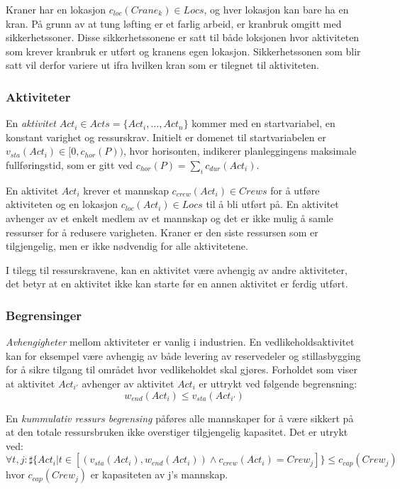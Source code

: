 Kraner har en lokasjon $ c_{loc}(Crane_{k}) \in Locs $, og hver lokasjon kan bare ha en kran. På grunn av at tung løfting er et farlig arbeid, er kranbruk omgitt med sikkerhetssoner. Disse sikkerhetssonene er satt til både loksjonen hvor aktiviteten som krever kranbruk er utført og kranens egen lokasjon. Sikkerhetssonen som blir satt vil derfor variere ut ifra hvilken kran som er tilegnet til aktiviteten.

\subsubsection{Aktiviteter}
En \textit{aktivitet} $ Act_{i} \in Acts = \{ Act_{i},\dots,Act_{n} \} $ kommer med en startvariabel, en konstant varighet og ressurskrav. Initielt er domenet til startvariabelen er $ v_{sta}(Act_{i}) \in [ 0, c_{hor}(P)) $, hvor horisonten, indikerer planleggingens maksimale fullføringstid, som er gitt ved $ c_{hor}(P) = \sum_{i} c_{dur}(Act_{i}) $.

En aktivitet $ Act_{i} $ krever et mannskap $ c_{crew}(Act_{i}) \in Crews $ for å utføre aktiviteten og en lokasjon $ c_{loc}(Act_{i}) \in Locs $ til å bli utført på. En aktivitet avhenger av et enkelt medlem av et mannskap og det er ikke mulig å samle ressurser for å redusere varigheten. Kraner er den siste ressursen som er tilgjengelig, men er ikke nødvendig for alle aktivitetene.

I tilegg til ressurskravene, kan en aktivitet være avhengig av andre aktiviteter, det betyr at en aktivitet ikke kan starte før en annen aktivitet er ferdig utført.

\subsubsection{Begrensinger}
\textit{Avhengigheter} mellom aktiviteter er vanlig i industrien. En vedlikeholdsaktivitet kan for eksempel være avhengig av både levering av reservedeler og stillasbygging for å sikre tilgang til området hvor vedlikeholdet skal gjøres. Forholdet som viser at aktivitet $ Act_{i'} $ avhenger av aktivitet $ Act_{i} $ er uttrykt ved følgende begrensning: 
\begin{equation}
w_{end}(Act_{i}) \leq v_{sta}(Act_{i'})
\end{equation}

En \textit{kummulativ ressurs begrensing} påføres alle mannskaper for å være sikkert på at den totale ressursbruken ikke overstiger tilgjengelig kapasitet. Det er utrykt ved: 
\begin{equation}
\forall t,j : \sharp \{ Act_{i} | t \in [(v_{sta}(Act_{i}), w_{end}(Act_{i})) \wedge c_{crew}(Act_{i}) = Crew_{j}] \} \leq c_{cap}(Crew_{j})
\end{equation}
hvor $ c_{cap}(Crew_{j}) $ er kapasiteten av j's mannskap.

